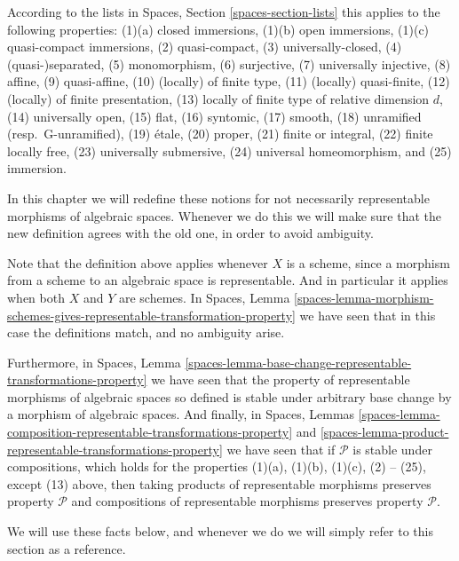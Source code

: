 \documentclass{stacks-project}
\theoremstyle{plain}
\theoremstyle{definition}
\theoremstyle{remark}
\numberwithin{equation}{subsection}
\begin{document}
\medskip\noindent
According to the lists in
Spaces, Section \ref{spaces-section-lists}
this applies to the following properties:
(1)(a) closed immersions,
(1)(b) open immersions,
(1)(c) quasi-compact immersions,
(2) quasi-compact,
(3) universally-closed,
(4) (quasi-)separated,
(5) monomorphism,
(6) surjective,
(7) universally injective,
(8) affine,
(9) quasi-affine,
(10) (locally) of finite type,
(11) (locally) quasi-finite,
(12) (locally) of finite presentation,
(13) locally of finite type of relative dimension $d$,
(14) universally open,
(15) flat,
(16) syntomic,
(17) smooth,
(18) unramified (resp.\ G-unramified),
(19) \'etale,
(20) proper,
(21) finite or integral,
(22) finite locally free,
(23) universally submersive,
(24) universal homeomorphism, and
(25) immersion.

\medskip\noindent
In this chapter we will redefine these notions for not necessarily
representable morphisms of algebraic spaces. Whenever we do this we will make
sure that the new definition agrees with the old one, in order to avoid
ambiguity.

\medskip\noindent
Note that the definition above applies whenever $X$ is a scheme,
since a morphism from a scheme to an algebraic space is representable.
And in particular it applies when both $X$ and $Y$ are schemes.
In
Spaces, Lemma
\ref{spaces-lemma-morphism-schemes-gives-representable-transformation-property}
we have seen that in this case the definitions
match, and no ambiguity arise.

\medskip\noindent
Furthermore, in
Spaces, Lemma
\ref{spaces-lemma-base-change-representable-transformations-property}
we have seen that the property of
representable morphisms of algebraic spaces so defined is stable under
arbitrary base change by a morphism of algebraic spaces.
And finally, in
Spaces, Lemmas
\ref{spaces-lemma-composition-representable-transformations-property} and
\ref{spaces-lemma-product-representable-transformations-property}
we have seen that if $\mathcal{P}$ is stable under compositions,
which holds for the properties
(1)(a), (1)(b), (1)(c), (2) -- (25), except (13) above, then
taking products of representable morphisms preserves property $\mathcal{P}$
and compositions of representable morphisms preserves property $\mathcal{P}$.

\medskip\noindent
We will use these facts below, and whenever we do we will simply refer
to this section as a reference.
\end{document}
